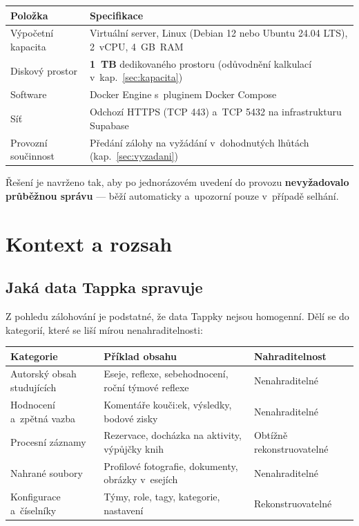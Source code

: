 \documentclass[11pt,a4paper]{article}
\begin{document}
\begin{center}
\begin{tabularx}{\textwidth}{@{}p{4.6cm}X@{}}
\toprule
\textbf{Položka} & \textbf{Specifikace} \\
\midrule
Výpočetní kapacita & Virtuální server, Linux (Debian 12 nebo Ubuntu 24.04 LTS), 2~vCPU, 4~GB~RAM \\
Diskový prostor & \textbf{1~TB} dedikovaného prostoru (odůvodnění kalkulací v~kap.~\ref{sec:kapacita}) \\
Software & Docker Engine s~pluginem Docker Compose \\
Síť & Odchozí HTTPS (TCP 443) a~TCP 5432 na infrastrukturu Supabase \\
Provozní součinnost & Předání zálohy na vyžádání v~dohodnutých lhůtách (kap.~\ref{sec:vyzadani}) \\
\bottomrule
\end{tabularx}
\end{center}

\medskip
Řešení je navrženo tak, aby po jednorázovém uvedení do provozu \textbf{nevyžadovalo průběžnou
správu} --- běží automaticky a~upozorní pouze v~případě selhání.

\newpage

\section{Kontext a rozsah}

\subsection{Jaká data Tappka spravuje}

Z pohledu zálohování je podstatné, že data Tappky nejsou homogenní. Dělí se do kategorií, které se
liší mírou nenahraditelnosti:

\begin{center}
\begin{tabularx}{\textwidth}{@{}p{4.0cm}X>{\raggedright\arraybackslash}p{3.1cm}@{}}
\toprule
\textbf{Kategorie} & \textbf{Příklad obsahu} & \textbf{Nahraditelnost} \\
\midrule
Autorský obsah studujících & Eseje, reflexe, sebehodnocení, roční týmové reflexe & Nenahraditelné \\
Hodnocení a~zpětná vazba & Komentáře kouči:ek, výsledky, bodové zisky & Nenahraditelné \\
Procesní záznamy & Rezervace, docházka na aktivity, výpůjčky knih & Obtížně rekonstruovatelné \\
Nahrané soubory & Profilové fotografie, dokumenty, obrázky v~esejích & Nenahraditelné \\
Konfigurace a~číselníky & Týmy, role, tagy, kategorie, nastavení & Rekonstruovatelné \\
\bottomrule
\end{tabularx}
\end{center}
\end{document}
